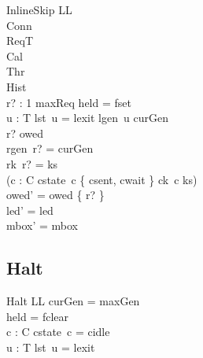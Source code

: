 \documentclass[a4paper,10pt,fleqn]{article}
\begin{document}
\begin{schema}{InlineSkip}
  \Delta LL \\
  \Xi Conn \\
  \Xi ReqT \\
  \Xi Cal \\
  \Xi Thr \\
  \Xi Hist \\
  r? : 1 \upto maxReq
\where
  held = fset \\
  \forall u : T \spot lst~u = lexit \lor lgen~u \neq curGen \\
  r? \in owed \\
  rgen~r? = curGen \\
  rk~r? = ks \\
  (\exists c : C \spot cstate~c \in \{ csent, cwait \} \land ck~c \neq ks) \\
  owed' = owed \setminus \{ r? \} \\
  led' = led \\
  mbox' = mbox
\end{schema}

\subsection{Halt}

\begin{schema}{Halt}
  \Xi LL
\where
  curGen = maxGen \\
  held = fclear \\
  \forall c : C \spot cstate~c = cidle \\
  \forall u : T \spot lst~u = lexit
\end{schema}
\end{document}

